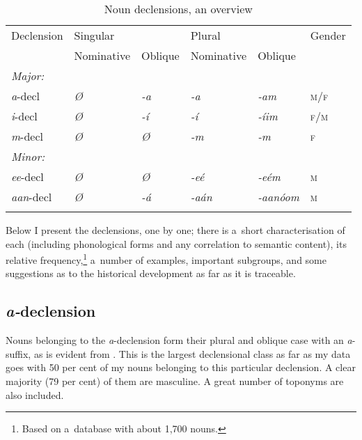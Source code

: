 \begin{table}[ht]
\caption{Noun declensions, an overview}
\begin{tabularx}{\textwidth}{ Q Q Q Q Q Q}
\lsptoprule
Declension &
Singular &
&
Plural &
&
Gender \\
&
Nominative &
Oblique &
Nominative &
Oblique
\\\hline
\textit{Major:}\\
\textit{a}-decl &
\textit{Ø} &
\textit{-a} &
\textit{-a} &
\textit{-am} &
\textsc{m/f} \\
\textit{i}-decl &
\textit{Ø} &
\textit{-í} &
\textit{-í} &
\textit{-íim} &
\textsc{f/m} \\
\textit{m}-decl &
\textit{Ø} &
\textit{Ø} &
\textit{-m} &
\textit{-m} &
\textsc{f} \\
\textit{Minor:}\\
\textit{ee}-decl &
\textit{Ø} &
\textit{Ø} &
\textit{-eé} &
\textit{-eém} &
\textsc{m}\\
\textit{aan}-decl &
\textit{Ø} &
\textit{-á} &
\textit{-aán} &
\textit{-aanóom} &
\textsc{m} \\\lspbottomrule
\end{tabularx}
\label{tab:4-5b}
\end{table}

  
  Below I present the declensions, one by one;
  there is a~short characterisation of each (including phonological forms and any correlation to
  semantic content), its relative frequency,\footnote{Based on a~database with about 1,700 nouns.} a~number of examples, important subgroups, and some suggestions as to the historical development as far as it is traceable.


\subsection{\textit{a-}declension}
\label{subsec:4-6-1}


Nouns belonging to the \textit{a}-declension form their plural and oblique case with an \textit{a}-suffix, as is evident from . This is the largest declensional class as far as my data goes with 50 per cent of my nouns belonging to this particular declension. A clear majority (79 per cent) of them are masculine. A great number of toponyms are also included.


